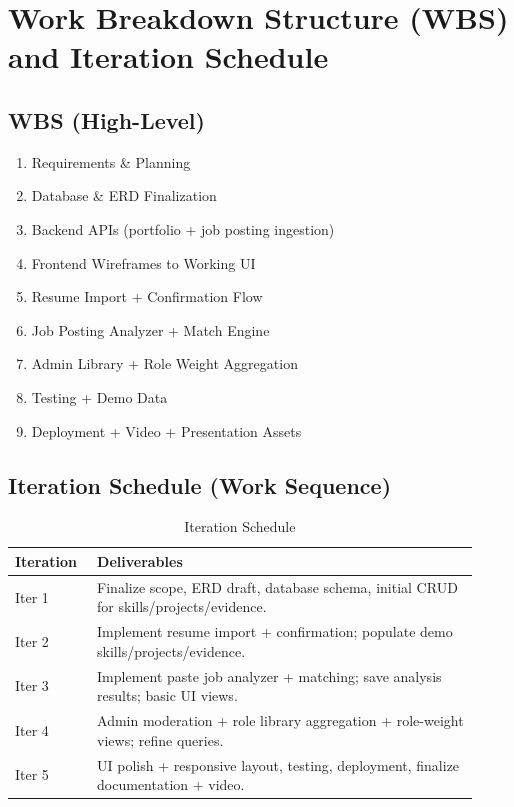 \documentclass[11pt]{article}
\begin{document}
\section{Work Breakdown Structure (WBS) and Iteration Schedule} %
\subsection{WBS (High-Level)}
\begin{enumerate}[leftmargin=*]
  \item Requirements \& Planning
  \item Database \& ERD Finalization
  \item Backend APIs (portfolio + job posting ingestion)
  \item Frontend Wireframes to Working UI
  \item Resume Import + Confirmation Flow
  \item Job Posting Analyzer + Match Engine
  \item Admin Library + Role Weight Aggregation
  \item Testing + Demo Data
  \item Deployment + Video + Presentation Assets
\end{enumerate}

\subsection{Iteration Schedule (Work Sequence)}
\begin{table}[H]
\centering
\renewcommand{\arraystretch}{1.2}
\begin{tabular}{p{0.16\linewidth} p{0.76\linewidth}}
\toprule
\textbf{Iteration} & \textbf{Deliverables} \\
\midrule
Iter 1 & Finalize scope, ERD draft, database schema, initial CRUD for skills/projects/evidence. \\
Iter 2 & Implement resume import + confirmation; populate demo skills/projects/evidence. \\
Iter 3 & Implement paste job analyzer + matching; save analysis results; basic UI views. \\
Iter 4 & Admin moderation + role library aggregation + role-weight views; refine queries. \\
Iter 5 & UI polish + responsive layout, testing, deployment, finalize documentation + video. \\
\bottomrule
\end{tabular}
\caption{Iteration Schedule}
\end{table}
\end{document}
